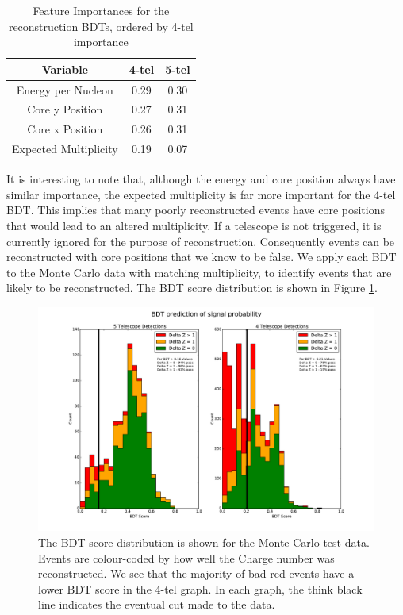 \documentclass[11pt]{article}
\begin{document}
\begin{table}[h!]
  \centering
  \caption{Feature Importances for the reconstruction BDTs, ordered by 4-tel importance}
  \label{tab:reconbdt}
  \begin{tabular}{ccc}
    \toprule
    Variable & 4-tel & 5-tel\\
    \midrule
    Energy per Nucleon & 0.29 & 0.30\\
    Core y Position & 0.27 & 0.31\\
    Core x Position & 0.26 & 0.31\\ 
    Expected Multiplicity & 0.19 & 0.07\\
    \bottomrule
  \end{tabular}
\end{table}

It is interesting to note that, although the energy and core position always have similar importance, the expected multiplicity is far more important for the 4-tel BDT. This implies that many poorly reconstructed events have core positions that would lead to an altered multiplicity. If a telescope is not triggered, it is currently ignored for the purpose of reconstruction. Consequently events can be reconstructed with core positions that we know to be false. We apply each BDT to the Monte Carlo data with matching multiplicity, to identify events that are likely to be reconstructed. The BDT score distribution is shown in Figure \ref{fig:reconBDTdistribution}.

\begin{figure}
\begin{center}
\includegraphics[width=\textwidth]{Likelihood}
\caption{The BDT score distribution is shown for the Monte Carlo test data. Events are colour-coded by how well the Charge number was reconstructed. We see that the majority of bad red events have a lower BDT score in the 4-tel graph. In each graph, the think black line indicates the eventual cut made to the data.}
\label{fig:reconBDTdistribution}
\end{center}
\end{figure}
\end{document}
